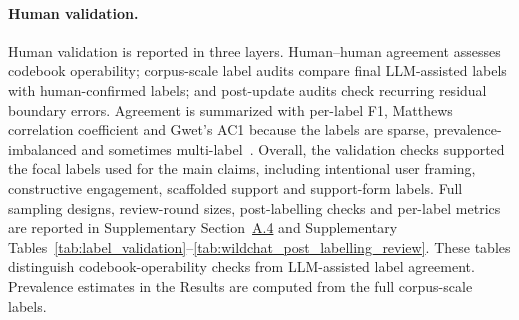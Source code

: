 \paragraph{Human validation.}
Human validation is reported in three layers. Human--human agreement assesses codebook operability; corpus-scale label audits compare final LLM-assisted labels with human-confirmed labels; and post-update audits check recurring residual boundary errors.
Agreement is summarized with per-label F1, Matthews correlation coefficient and Gwet's AC1 because the labels are sparse, prevalence-imbalanced and sometimes multi-label~\cite{matthews1975comparison,gwet2008computing}.
Overall, the validation checks supported the focal labels used for the main claims, including intentional user framing, constructive engagement, scaffolded support and support-form labels.
Full sampling designs, review-round sizes, post-labelling checks and per-label metrics are reported in Supplementary Section~\hyperref[supp:a4]{A.4} and Supplementary Tables~\ref{tab:label_validation}--\ref{tab:wildchat_post_labelling_review}. These tables distinguish codebook-operability checks from LLM-assisted label agreement.
Prevalence estimates in the Results are computed from the full corpus-scale labels.





